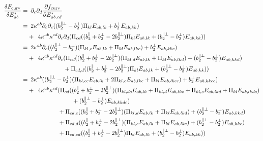 \documentclass[11pt]{article}
\begin{document}
\begin{align}
    \fdv{F_\text{curv}}{E_{ab}^*} =&\enspace \pp_c\pp_d \pdv{f_\text{curv}}{E_{ab,cd}^*} \\
    =&\enspace 2\kappa^{ab} \pp_c\pp_c ((b_2^{\parallel\perp}-b_2^\perp)\Pi_{kl}E_{ab,lk}+b_2^\perp E_{ab,kk}) \\
    &+\enspace 4\kappa^{ab}\kappa^{cd} \pp_c \pp_d (\Pi_{cd} ((b_2^\parallel + b_2^\perp - 2b_2^{\parallel\perp})\Pi_{kl}E_{ab,lk} + (b_2^{\parallel\perp}-b_2^\perp)E_{ab,kk})) \\
    =&\enspace 2\kappa^{ab} \pp_c ((b_2^{\parallel\perp}-b_2^\perp)(\Pi_{kl,c}E_{ab,lk}+\Pi_{kl}E_{ab,lkc}) + b_2^\perp E_{ab,kkc}) \\
    &+\enspace 4\kappa^{ab}\kappa^{cd} \pp_c (\Pi_{cd} ((b_2^\parallel + b_2^\perp - 2b_2^{\parallel\perp})(\Pi_{kl,d}E_{ab,lk}+\Pi_{kl}E_{ab,lkd}) + (b_2^{\parallel\perp}-b_2^\perp)E_{ab,kkd}) \\
    &\enspace\phantom{+\enspace 4\kappa^{ab}\kappa^{cd} \pp_c} + \Pi_{cd,d} ((b_2^\parallel + b_2^\perp - 2b_2^{\parallel\perp})\Pi_{kl}E_{ab,lk} + (b_2^{\parallel\perp}-b_2^\perp)E_{ab,kk})) \\
    =&\enspace 2\kappa^{ab} ((b_2^{\parallel\perp}-b_2^\perp)(\Pi_{kl,cc}E_{ab,lk}+2\Pi_{kl,c}E_{ab,lkc}+\Pi_{kl}E_{ab,lkcc}) + b_2^\perp E_{ab,kkcc}) \\
    &+\enspace 4\kappa^{ab}\kappa^{cd} (\Pi_{cd} ((b_2^\parallel + b_2^\perp - 2b_2^{\parallel\perp})(\Pi_{kl,dc}E_{ab,lk}+\Pi_{kl,d}E_{ab,lkc}+\Pi_{kl,c}E_{ab,lkd}+\Pi_{kl}E_{ab,lkdc}) \\
    &\enspace\phantom{+\enspace 4\kappa^{ab}\kappa^{cd} (\Pi_{cd} (} + (b_2^{\parallel\perp}-b_2^\perp)E_{ab,kkdc}) \\
    &\enspace\phantom{+\enspace 4\kappa^{ab}\kappa^{cd}} + \Pi_{cd,c} ((b_2^\parallel + b_2^\perp - 2b_2^{\parallel\perp})(\Pi_{kl,d}E_{ab,lk}+\Pi_{kl}E_{ab,lkd}) + (b_2^{\parallel\perp}-b_2^\perp)E_{ab,kkd}) \\
    &\enspace\phantom{+\enspace 4\kappa^{ab}\kappa^{cd}} + \Pi_{cd,d} ((b_2^\parallel + b_2^\perp - 2b_2^{\parallel\perp})(\Pi_{kl,c}E_{ab,lk}+\Pi_{kl}E_{ab,lkc}) + (b_2^{\parallel\perp}-b_2^\perp)E_{ab,kkc}) \\
    &\enspace\phantom{+\enspace 4\kappa^{ab}\kappa^{cd}} + \Pi_{cd,cd} ((b_2^\parallel + b_2^\perp - 2b_2^{\parallel\perp})\Pi_{kl}E_{ab,lk} + (b_2^{\parallel\perp}-b_2^\perp)E_{ab,kk})) \\
\end{align}
\end{document}
